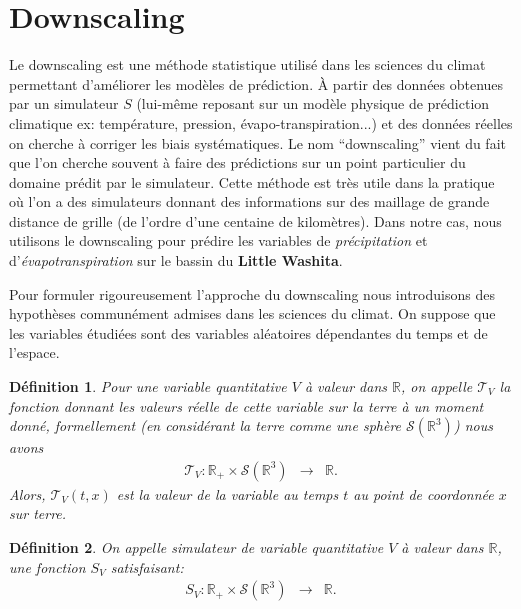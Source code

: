 \documentclass[a4paper,10pt]{article}
\newtheorem{definition}{Définition}
\begin{document}
\section{Downscaling}
\label{dwnsc}
Le downscaling est une méthode statistique utilisé dans les sciences du climat permettant d'améliorer les modèles de prédiction. À partir des données obtenues par un simulateur $S$ (lui-même reposant sur un modèle physique de prédiction climatique ex: température, pression, évapo-transpiration...) et des données réelles on cherche à corriger les biais systématiques. Le nom ``downscaling'' vient du fait que l'on cherche souvent à faire des prédictions sur un point particulier du domaine prédit par le simulateur. Cette méthode est très utile dans la pratique où l'on a des simulateurs donnant des informations sur des maillage de grande distance de grille (de l'ordre d'une centaine de kilomètres). Dans notre cas, nous utilisons le downscaling pour prédire les variables de \textit{précipitation} et d'\textit{évapotranspiration} sur le bassin du \textbf{Little Washita}.

Pour formuler rigoureusement l'approche du downscaling nous introduisons des hypothèses communément admises dans les sciences du climat. On suppose que les variables étudiées sont des variables aléatoires dépendantes du temps et de l'espace.

\begin{definition}
	\label{terre}
	Pour une variable quantitative $V$ à valeur dans $\mathbb{R}$, on appelle $\mathcal{T}_V$ la fonction donnant les  valeurs réelle de cette variable sur la terre à un moment donné, formellement (en considérant la terre comme une sphère $\mathcal{S}(\mathbb{R}^3)$) nous avons
	\begin{equation}
		\begin{array}{ccc}
			\mathcal{T}_V: \mathbb{R}_{+}\times\mathcal{S}(\mathbb{R}^{3}) & \to & \mathbb{R}.
		\end{array}
	\end{equation}
	Alors, $\mathcal{T}_V(t,x)$ est la valeur de la variable au temps $t$ au point de coordonnée $x$ sur terre.	
\end{definition}

\begin{definition}
	\label{simu_terre}
	On appelle simulateur de variable quantitative $V$ à valeur dans $\mathbb{R}$, une fonction $S_V$ satisfaisant:
	\begin{equation}
		\begin{array}{ccc}
			S_V: \mathbb{R}_{+}\times\mathcal{S}(\mathbb{R}^{3}) & \to & \mathbb{R}.
		\end{array}
	\end{equation}
\end{definition}
\end{document}
